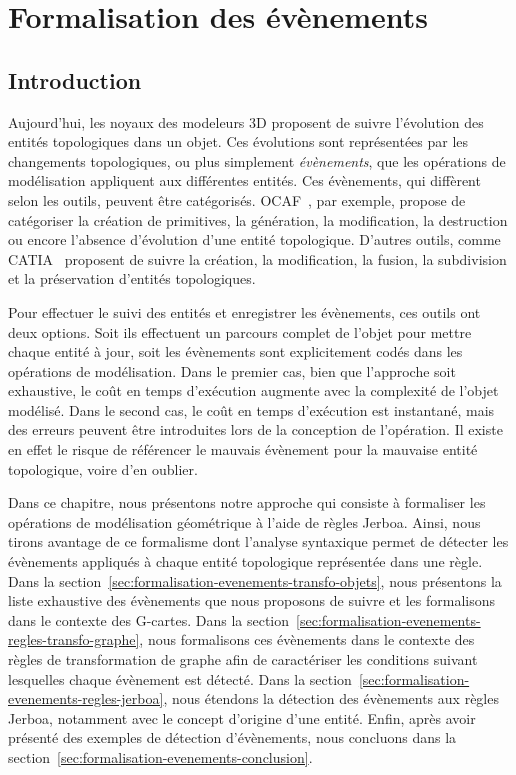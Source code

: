 \chapter[Formalisation des évènements]{Formalisation des évènements}
\label{cha:formalisation-evenements}



\section{Introduction}
\label{sec:formalisation-evenements-introduction}



Aujourd'hui, les noyaux des modeleurs 3D proposent de suivre l'évolution des
entités topologiques dans un objet. %
Ces évolutions sont représentées par les changements topologiques, ou plus
simplement \textit{évènements}, que les opérations de modélisation appliquent aux
différentes entités. %
Ces évènements, qui diffèrent selon les outils, peuvent être catégorisés. %
OCAF~\cite{OCAF}, par exemple, propose de catégoriser la création de primitives,
la génération, la modification, la destruction ou encore l'absence d'évolution
d'une entité topologique. %
D'autres outils, comme CATIA~\cite{dassaultCATIA} proposent de suivre la
création, la modification, la fusion, la subdivision et la préservation
d'entités topologiques. %

Pour effectuer le suivi des entités et enregistrer les évènements, ces outils
ont deux options. %
Soit ils effectuent un parcours complet de l'objet pour mettre chaque entité à
jour, soit les évènements sont explicitement codés dans les
opérations de modélisation. %
Dans le premier cas, bien que l'approche soit exhaustive, le coût en temps d'exécution augmente avec la complexité de l'objet modélisé. %
Dans le second cas, le coût en temps d'exécution est instantané, mais des
erreurs peuvent être introduites lors de la conception de l'opération. %
Il existe en effet le risque de référencer le mauvais évènement pour la
mauvaise entité topologique, voire d'en oublier. %

Dans ce chapitre, nous présentons notre approche qui consiste à formaliser les
opérations de modélisation géométrique à l'aide de règles Jerboa. %
Ainsi, nous tirons avantage de ce formalisme dont l'analyse syntaxique
permet de détecter les évènements appliqués à chaque entité topologique
représentée dans une règle. %
Dans la section~\ref{sec:formalisation-evenements-transfo-objets}, nous présentons la liste exhaustive des évènements que
nous proposons de suivre et les formalisons dans le contexte des G-cartes. %
Dans la section~\ref{sec:formalisation-evenements-regles-transfo-graphe}, nous formalisons ces évènements dans le contexte des
règles de transformation de graphe afin de caractériser les conditions
suivant lesquelles chaque évènement est détecté. %
Dans la section~\ref{sec:formalisation-evenements-regles-jerboa}, nous étendons la détection des évènements aux règles
Jerboa, notamment avec le concept d'origine d'une entité. %
Enfin, après avoir présenté des exemples de détection d'évènements, nous concluons dans la section~\ref{sec:formalisation-evenements-conclusion}. %


